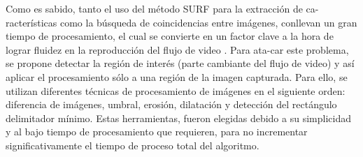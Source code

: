 Como es sabido, tanto el uso del método SURF para la extracción de ca-racterísticas como la búsqueda de coincidencias entre imágenes, conllevan un gran tiempo de procesamiento, el cual se convierte en un factor clave a la hora de lograr fluidez en la reproducción del flujo de video \cite{citeulike:9456628, Beis:1997:SIU:794189.794431, Friedman:1977:AFB:355744.355745, Liu04aninvestigation}. Para ata-car este problema, se propone detectar la región de interés (parte cambiante del flujo de video) y así aplicar el procesamiento sólo a una región de la imagen capturada. Para ello, se utilizan diferentes técnicas de procesamiento de imágenes en el siguiente orden: diferencia de imágenes, umbral, erosión, dilatación y detección del rectángulo delimitador mínimo. Estas herramientas, fueron elegidas debido a su simplicidad y al bajo tiempo de procesamiento que requieren, para no incrementar significativamente el tiempo de proceso total del algoritmo.

